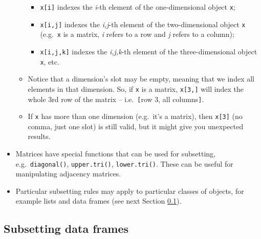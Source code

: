 \documentclass[
]{book}
\providecommand{\tightlist}{%
  \setlength{\itemsep}{0pt}\setlength{\parskip}{0pt}}
\begin{document}
\begin{itemize}
\begin{itemize}
    \begin{itemize}
    \tightlist
    \item
      \texttt{x{[}i{]}} indexes the \emph{i}-th element of the one-dimensional object \texttt{x};
    \item
      \texttt{x{[}i,j{]}} indexes the \emph{i,j}-th element of the two-dimensional object \texttt{x} (e.g.~\texttt{x} is a matrix, \emph{i} refers to a row and \emph{j} refers to a column);
    \item
      \texttt{x{[}i,j,k{]}} indexes the \emph{i,j,k}-th element of the three-dimensional object \texttt{x}, etc.
    \end{itemize}
  \item
    Notice that a dimension's slot may be empty, meaning that we index all elements in that dimension. So, if \texttt{x} is a matrix, \texttt{x{[}3,{]}} will index the whole 3rd row of the matrix -- i.e.~\texttt{{[}}row 3, all columns\texttt{{]}}.
  \item
    If \texttt{x} has more than one dimension (e.g.~it's a matrix), then \texttt{x{[}3{]}} (no comma, just one slot) is still valid, but it might give you unexpected results.
  \end{itemize}
\item
  Matrices have special functions that can be used for subsetting, e.g.~\texttt{diagonal()}, \texttt{upper.tri()}, \texttt{lower.tri()}. These can be useful for manipulating adjacency matrices.
\item
  Particular subsetting rules may apply to particular classes of objects, for example lists and data frames (see next Section \ref{index-df}).
\end{itemize}

\hypertarget{index-df}{%
\subsection{Subsetting data frames}\label{index-df}}
\end{document}
